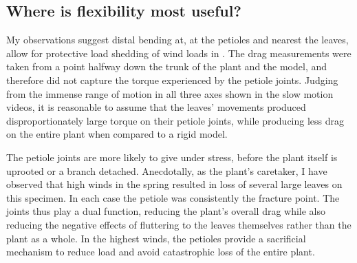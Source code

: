 \subsection{Where is flexibility most useful?}
My observations suggest distal bending at, at the petioles and nearest the leaves, allow for protective load shedding of wind loads in \Cxparadisi. The drag measurements were taken from a point halfway down the trunk of the plant and the model, and therefore did not capture the torque experienced by the petiole joints. Judging from the immense range of motion in all three axes shown in the slow motion videos, it is reasonable to assume that the leaves' movements produced disproportionately large torque on their petiole joints, while producing less drag on the entire plant when compared to a rigid model. 

The petiole joints are more likely to give under stress, before the plant itself is uprooted or a branch detached. Anecdotally, as the plant's caretaker, I have observed that high winds in the spring resulted in loss of several large leaves on this specimen. In each case the petiole was consistently the fracture point. The joints thus play a dual function, reducing the plant's overall drag while also reducing the negative effects of fluttering to the leaves themselves rather than the plant as a whole. In the highest winds, the petioles provide a sacrificial mechanism to reduce load and avoid catastrophic loss of the entire plant. 

